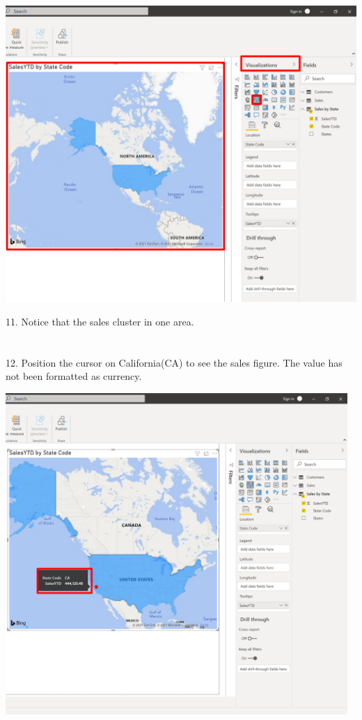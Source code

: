 \documentclass[12pt,letterpaper]{article}
\begin{document}
\begin{center}
    \includegraphics[width=17cm]{img/108.png}
    \vspace{6cm}
\end{center}
11. Notice that the sales cluster in one area.
\\\\\\12. Position the cursor on California(CA) to see the sales figure. The value has not been formatted as currency.
\begin{center}
    \includegraphics[width=13cm]{img/109.png}
\end{center}
\end{document}
